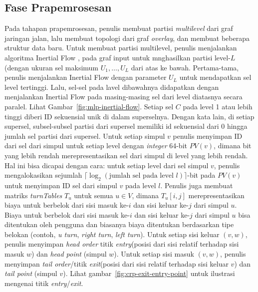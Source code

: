 \subsection{Fase Prapemrosesan}
\label{subsec:tdcrp-preprocessing}
Pada tahapan prapemrosesan, penulis membuat partisi \textit{multilevel} dari graf jaringan jalan, lalu membuat topologi dari graf \textit{overlay}, dan membuat beberapa struktur data baru. Untuk membuat partisi multilevel, penulis menjalankan algoritma Inertial Flow \cite{Schild2015}, pada graf input untuk mnghasilkan partisi level-$L$ (dengan ukuran sel maksimum $U_1,\ldots, U_{L}$ dari atas ke bawah. Pertama-tama, penulis menjalankan Inertial Flow dengan parameter $U_L$ untuk mendapatkan sel level tertinggi. Lalu, sel-sel pada lavel dibawahnya didapatkan dengan menjalankan Inertial Flow pada masing-masing sel dari level diatasnya secara paralel. Lihat Gambar~\ref{fig:mlp-inertial-flow}. Setiap sel $C$ pada level 1 atau lebih tinggi diberi ID sekuensial unik di dalam superselnya. Dengan kata lain, di setiap supersel, subsel-subsel partisi dari supersel memiliki id sekuensial dari 0 hingga jumlah sel partisi dari supersel. Untuk setiap simpul $v$ penulis menyimpan ID dari sel dari simpul untuk setiap level dengan \textit{integer} 64-bit $PV(v)$, dimana bit yang lebih rendah merepresentasikan sel dari simpul di level yang lebih rendah. Hal ini bisa dicapai dengan cara: untuk setiap level dari sel simpul $v$, penulis mengalokasikan sejumlah $\lceil \log_2(\text{jumlah sel pada level } l) \rceil$-bit pada $PV(v)$ untuk menyimpan ID sel dari simpul $v$ pada level $l$. Penulis juga membuat matriks \textit{turnTables} $T_u$ untuk semua $u\in V$, dimana $T_u[i,j]$ merepresentasikan biaya untuk berbelok dari sisi masuk ke-$i$ dan sisi keluar ke-$j$ dari simpul $u$. Biaya untuk berbelok dari sisi masuk ke-$i$ dan sisi keluar ke-$j$ dari simpul $u$ bisa ditentukan oleh pengguna dan biasanya biaya ditentukan berdasarkan tipe belokan (contoh, \textit{u turn},  \textit{right turn}, \textit{left turn}). Untuk setiap sisi keluar $(v,w)$, penulis menyimpan \textit{head order} titik \textit{entry}(posisi dari sisi relatif terhadap sisi masuk $w$) dan \textit{head point} (simpul $w$). Untuk setiap sisi masuk $(v,w)$, penulis menyimpan \textit{tail order}/titik \textit{exit}(posisi dari sisi relatif terhadap sisi keluar $v$) dan \textit{tail point} (simpul $v$). Lihat gambar~\ref{fig:crp-exit-entry-point} untuk ilustrasi mengenai titik \textit{entry}/\textit{exit}.

